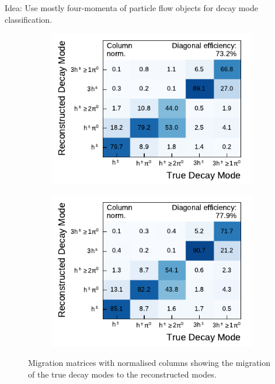 

Idea: Use mostly four-momenta of particle flow objects for decay mode
classification.

\begin{figure}[ht]
  \begin{subfigure}[t]{0.48\textwidth}
    \centering
    \includegraphics{./figures/decay_mode_classification/mig_mat_pantau.pdf}
  \end{subfigure}\hfill
  \begin{subfigure}[t]{0.48\textwidth}
    \centering
    \includegraphics{./figures/decay_mode_classification/mig_mat_baseline_ptcut_1_5.pdf}
  \end{subfigure}
  \caption{Migration matrices with normalised columns showing the migration of
    the true decay modes to the reconstructed modes.}
  \label{fig:migmat}
\end{figure}


